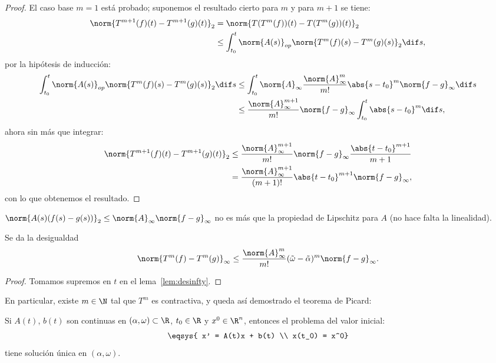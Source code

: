 \documentclass[../ecuaciones_diferenciales.tex]{subfiles}
\begin{document}
\begin{proof}
	El caso base \(m = 1\) está probado; suponemos el resultado cierto para
	\(m\) y para \(m + 1\) se tiene:
	\begin{align*}
		\norm{T^{m + 1}(f)(t) - T^{m + 1}(g)(t)}_2
		 & = \norm{T(T^m(f))(t) - T(T^m (g))(t)}_2 \\
		 & \leq \int_{t_0}^t \norm{A(s)}_{op}
		\norm{T^m(f)(s) - T^m (g)(s)}_2 \dif s,
	\end{align*}
	por la hipótesis de inducción:
	\begin{align*}
		\int_{t_0}^t \norm{A(s)}_{op}
		\norm{T^m(f)(s) - T^m (g)(s)}_2 \dif s
		 & \leq \int_{t_0}^t \norm{A}_\infty
		\frac{\norm{A}^m_\infty}{m!} \abs{s - t_0}^m
		\norm{f - g}_\infty \dif s                                     \\
		 & \leq \frac{\norm{A}^{m + 1}_\infty}{m!} \norm{f - g}_\infty
		\int_{t_0}^t \abs{s - t_0}^m \dif s,
	\end{align*}
	ahora sin más que integrar:
	\begin{align*}
		\norm{T^{m + 1}(f)(t) - T^{m + 1}(g)(t)}_2
		 & \leq \frac{\norm{A}^{m + 1}_\infty}{m!} \norm{f - g}_\infty
		\frac{\abs{t - t_0}^{m + 1}}{m + 1}                                 \\
		 & = \frac{\norm{A}^{m + 1}_\infty}{(m + 1)!} \abs{t - t_0}^{m + 1}
		\norm{f - g}_\infty,
	\end{align*}
	con lo que obtenemos el resultado.
\end{proof}

\begin{remark}
	\(\norm{A(s)(f(s)-g(s))}_2 \leq \norm{A}_\infty \norm{f-g}_\infty\) no es más
	que la propiedad de Lipschitz para \(A\) (no hace falta la linealidad).
\end{remark}

\begin{corollary}
	Se da la desigualdad
	\[\norm{T^m(f) - T^m(g)}_\infty \leq
		\frac{\norm{A}^m_\infty}{m!} (\tilde{\omega} - \tilde{\alpha})^m
		\norm{f - g}_\infty.\]
\end{corollary}

\begin{proof}
	Tomamos supremos en \(t\) en el lema~\ref{lem:desinfty}.
\end{proof}

En particular, existe \(m \in \N\) tal que \(T^m\) es contractiva, y queda así
demostrado el teorema de Picard:

\begin{theorem}[Picard]
	Si \(A(t)\), \(b(t)\) son continuas en \((\alpha, \omega) \subset \R\),
	\(t_0 \in \R\) y \(x^0 \in \R^n\), entonces el problema del valor inicial:
	\[\eqsys{
			x' = A(t)x + b(t) \\
			x(t_0) = x^0}\]
	tiene solución única en \((\alpha, \omega)\).
\end{theorem}
\end{document}
